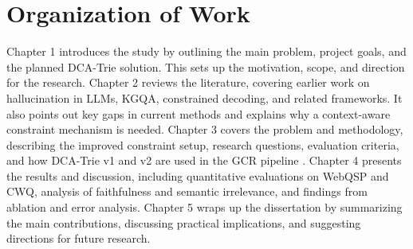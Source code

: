 \section{Organization of Work}

Chapter 1 introduces the study by outlining the main problem, project goals, and the planned DCA-Trie solution. This sets up the motivation, scope, and direction for the research. Chapter 2 reviews the literature, covering earlier work on hallucination in LLMs, KGQA, constrained decoding, and related frameworks. It also points out key gaps in current methods and explains why a context-aware constraint mechanism is needed. Chapter 3 covers the problem and methodology, describing the improved constraint setup, research questions, evaluation criteria, and how DCA-Trie v1 and v2 are used in the GCR pipeline \citep{luo2025-graph-constrained-reasoning}. Chapter 4 presents the results and discussion, including quantitative evaluations on WebQSP and CWQ, analysis of faithfulness and semantic irrelevance, and findings from ablation and error analysis. Chapter 5 wraps up the dissertation by summarizing the main contributions, discussing practical implications, and suggesting directions for future research.
